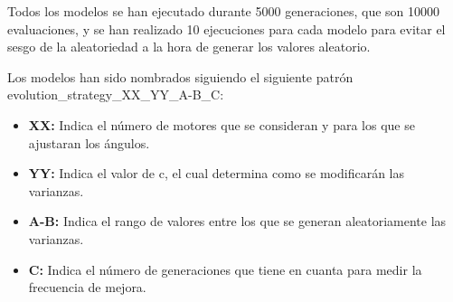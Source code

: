 \documentclass[12pt, spanish, pdftex]{UC3M_document}
\begin{document}
Todos los modelos se han ejecutado durante 5000 generaciones, que son 10000 evaluaciones, y se han realizado 10 ejecuciones para cada modelo para evitar el sesgo de la aleatoriedad a la hora de generar los valores aleatorio.

Los modelos han sido nombrados siguiendo el siguiente patrón evolution\_strategy\_XX\_YY\_A-B\_C:
\begin{itemize}
	\item \textbf{XX:} Indica el número de motores que se consideran y para los que se ajustaran los ángulos.
	\item \textbf{YY:} Indica el valor de c, el cual determina como se modificarán las varianzas.
	\item \textbf{A-B:} Indica el rango de valores entre los que se generan aleatoriamente las varianzas.
	\item \textbf{C:} Indica el número de generaciones que tiene en cuanta para medir la frecuencia de mejora.
\end{itemize}
\end{document}
